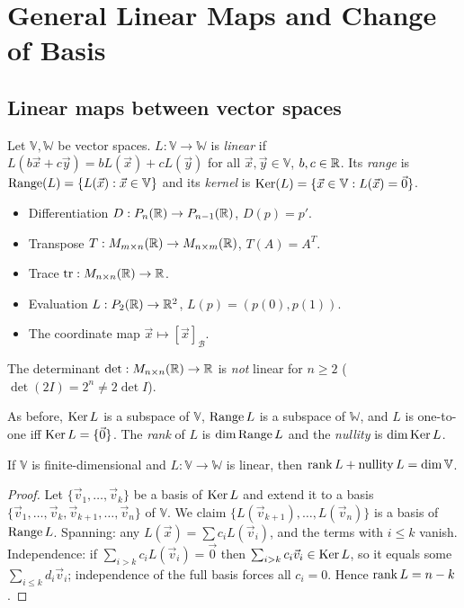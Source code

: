 \chapter{General Linear Maps and Change of Basis}

\section{Linear maps between vector spaces}

\begin{definition}
Let $\mathbb V,\mathbb W$ be vector spaces. $L:\mathbb V\to\mathbb W$ is \emph{linear} if
$L(b\vec x+c\vec y)=bL(\vec x)+cL(\vec y)$ for all $\vec x,\vec y\in\mathbb V$, $b,c\in\mathbb{R}$. Its \emph{range} is
$\operatorname{Range}(L)=\{L(\vec x):\vec x\in\mathbb V\}$ and its \emph{kernel} is $\operatorname{Ker}(L)=\{\vec x\in\mathbb V:L(\vec x)=\vec 0\}$.
\end{definition}

\begin{example}
\begin{itemize}
  \item Differentiation $D:P_{n}(\mathbb{R})\to P_{n-1}(\mathbb{R})$, $D(p)=p'$.
  \item Transpose $T:M_{m\times n}(\mathbb{R})\to M_{n\times m}(\mathbb{R})$, $T(A)=A^T$.
  \item Trace $\operatorname{tr}:M_{n\times n}(\mathbb{R})\to\mathbb{R}$.
  \item Evaluation $L:P_{2}(\mathbb{R})\to\mathbb{R}^2$, $L(p)=(p(0),p(1))$.
  \item The coordinate map $\vec x\mapsto[\vec x]_{\mathcal B}$.
\end{itemize}
The determinant $\det:M_{n\times n}(\mathbb{R})\to\mathbb{R}$ is \emph{not} linear for $n\ge2$ ($\det(2I)=2^n\ne2\det I$).
\end{example}

As before, $\operatorname{Ker} L$ is a subspace of $\mathbb V$, $\operatorname{Range} L$ is a subspace of $\mathbb W$, and $L$ is one-to-one iff
$\operatorname{Ker} L=\{\vec 0\}$. The \emph{rank} of $L$ is $\dim\operatorname{Range} L$ and the \emph{nullity} is $\dim\operatorname{Ker} L$.

\begin{theorem}
If $\mathbb V$ is finite-dimensional and $L:\mathbb V\to\mathbb W$ is linear, then
$\operatorname{rank} L+\operatorname{nullity} L=\dim\mathbb V$.
\end{theorem}
\begin{proof}
Let $\{\vec v_1,\dots,\vec v_k\}$ be a basis of $\operatorname{Ker} L$ and extend it to a basis
$\{\vec v_1,\dots,\vec v_k,\vec v_{k+1},\dots,\vec v_n\}$ of $\mathbb V$. We claim
$\{L(\vec v_{k+1}),\dots,L(\vec v_n)\}$ is a basis of $\operatorname{Range} L$. Spanning: any $L(\vec x)=\sum c_iL(\vec v_i)$, and the
terms with $i\le k$ vanish. Independence: if $\sum_{i>k}c_iL(\vec v_i)=\vec0$ then $\sum_{i>k}c_i\vec v_i\in\operatorname{Ker} L$,
so it equals some $\sum_{i\le k}d_i\vec v_i$; independence of the full basis forces all $c_i=0$. Hence
$\operatorname{rank} L=n-k$.
\end{proof}

